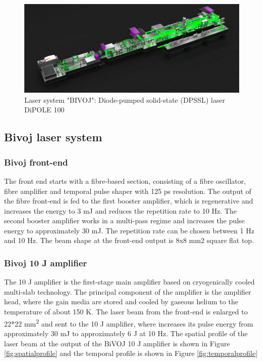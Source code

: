 \begin{figure}[h]
    \centering
    \includegraphics[width=1.0\linewidth]{img/bivoj.jpg}
    \caption{Laser system "BIVOJ": Diode-pumped solid-state (DPSSL) laser DiPOLE 100}
    \label{fig:bivoj}
\end{figure}

\subsection{Bivoj laser system}

\subsubsection*{Bivoj front-end}

The front end starts with a fibre-based section, consisting
of a fibre oscillator, fibre amplifier and temporal pulse shaper
with 125 ps resolution. The output of the fibre front-end is fed
to the first booster amplifier, which is regenerative and
increases the energy to 3 mJ and reduces the repetition rate to 10
Hz. The second booster amplifier works in a multi-pass regime
and increases the pulse energy to approximately 30 mJ.
The repetition rate can be chosen between 1 Hz and 10 Hz. The
beam shape at the front-end output is 8x8 mm2 square flat top.

\subsubsection*{Bivoj 10 J amplifier}

The 10 J amplifier is the first-stage main amplifier based on
cryogenically cooled multi-slab technology. The principal
component of the amplifier is the amplifier head, where the
gain media are stored and cooled by gaseous helium to 
the temperature of about 150 K. The laser beam from the front-end
is enlarged to 22*22 mm\textsuperscript{2} and sent to the 10 J amplifier, where
increases its pulse energy from approximately 30 mJ to
approximately 6 J at 10 Hz. The spatial profile of the laser beam at the output of the BiVOJ 10 J amplifier is shown in Figure \ref{fig:spatialprofile} and the temporal profile is shown in Figure \ref{fig:temporalprofile}

